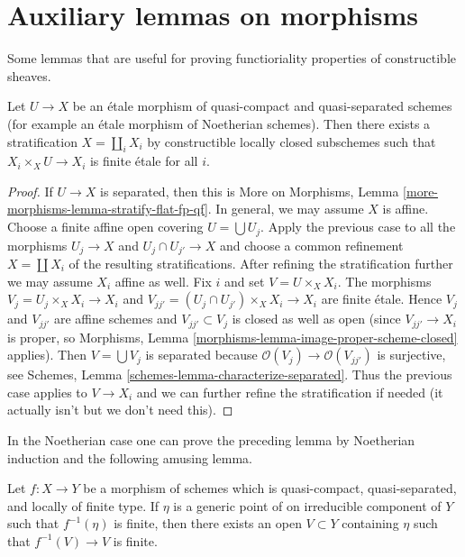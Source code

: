 \section{Auxiliary lemmas on morphisms}
\label{section-stratify-morphisms}

\noindent
Some lemmas that are useful for proving functioriality properties
of constructible sheaves.

\begin{lemma}
\label{lemma-etale-stratified-finite}
Let $U \to X$ be an \'etale morphism of quasi-compact and quasi-separated
schemes (for example an \'etale morphism of Noetherian schemes). Then there
exists a stratification $X = \coprod_i X_i$ by constructible locally closed
subschemes such that $X_i \times_X U \to X_i$ is finite \'etale for all $i$.
\end{lemma}

\begin{proof}
If $U \to X$ is separated, then this is
More on Morphisms, Lemma \ref{more-morphisms-lemma-stratify-flat-fp-qf}.
In general, we may assume $X$ is affine. Choose a finite affine open
covering $U = \bigcup U_j$. Apply the previous case to all the morphisms
$U_j \to X$ and $U_j \cap U_{j'} \to X$ and choose a common
refinement $X = \coprod X_i$ of the resulting stratifications.
After refining the stratification further we may assume $X_i$ affine as well.
Fix $i$ and set $V = U \times_X X_i$. The morphisms
$V_j = U_j \times_X X_i \to X_i$ and
$V_{jj'} = (U_j \cap U_{j'}) \times_X X_i \to X_i$ are finite \'etale.
Hence $V_j$ and $V_{jj'}$ are affine schemes and $V_{jj'} \subset V_j$
is closed as well as open (since $V_{jj'} \to X_i$ is proper, so
Morphisms, Lemma \ref{morphisms-lemma-image-proper-scheme-closed}
applies). Then $V = \bigcup V_j$ is separated because
$\mathcal{O}(V_j) \to \mathcal{O}(V_{jj'})$ is surjective, see
Schemes, Lemma \ref{schemes-lemma-characterize-separated}.
Thus the previous case applies to $V \to X_i$ and we can further
refine the stratification if needed (it actually isn't but we don't
need this).
\end{proof}

\noindent
In the Noetherian case one can prove the preceding lemma by
Noetherian induction and the following amusing lemma.

\begin{lemma}
\label{lemma-generically-finite}
Let $f: X \to Y$ be a morphism of schemes which is quasi-compact,
quasi-separated, and locally of finite type. If $\eta$ is a generic point
of on irreducible component of $Y$ such that $f^{-1}(\eta)$ is finite, then
there exists an open $V \subset Y$ containing $\eta$ such that
$f^{-1}(V) \to V$ is finite.
\end{lemma}

